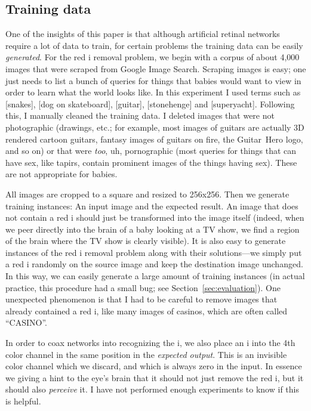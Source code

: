 \documentclass[twocolumn]{article}
\begin{document}
\subsection{Training data}

One of the insights of this paper is that although artificial retinal
networks require a lot of data to train, for certain problems the
training data can be easily {\em generated}. For the red i removal
problem, we begin with a corpus of about 4,000 images that were
scraped from Google Image Search. Scraping images is easy; one just
needs to list a bunch of queries for things that babies would want to
view in order to learn what the world looks like. In this experiment I
used terms such as [snakes], [dog on skateboard], [guitar],
[stonehenge] and [superyacht]. Following this, I manually cleaned the
training data. I deleted images that were not photographic (drawings,
etc.; for example, most images of guitars are actually 3D rendered
cartoon guitars, fantasy images of guitars on fire, the Guitar~Hero logo,
and so on) or that were {\em too}, uh, pornographic (most queries for
things that can have sex, like tapirs, contain prominent images of the
things having sex). These are not appropriate for babies.

All images are cropped to a square and resized to 256x256. Then we
generate training instances: An input image and the expected result.
An image that does not contain a red i should just be transformed into
the image itself (indeed, when we peer directly into the brain of a
baby looking at a TV show, we find a region of the brain where the TV
show is clearly visible). It is also easy to generate instances of the
red i removal problem along with their solutions---we simply put a red
i randomly on the source image and keep the destination image
unchanged. In this way, we can easily generate a large amount of
training instances (in actual practice, this procedure had a small bug;
see Section~\ref{sec:evaluation}). One unexpected phenomenon is that
I had to be careful to remove images that already contained a red i,
like many images of casinos, which are often called ``CASINO''.


In order to coax networks into recognizing the i, we also place an i
into the 4th color channel in the same position in the {\em expected
output}. This is an invisible color channel which we discard, and
which is always zero in the input. In essence we giving a hint to the
eye's brain that it should not just remove the red i, but it should
also {\em perceive} it. I have not performed enough experiments to
know if this is helpful.
\end{document}
